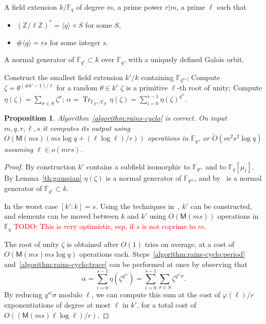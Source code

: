 \documentclass[12pt]{article}
\theoremstyle{plain}
\newtheorem{proposition}[theorem]{Proposition}
\theoremstyle{definition}
\newcommand{\tildO}{\tilde{O}}
\newcommand{\todo}[1]{\textcolor{red}{TODO: #1}}
\DeclareMathOperator{\trace}{Tr} %
\def\Z{\ensuremath{\mathbb{Z}}}
\def\F{\ensuremath{\mathbb{F}}}
\def\MM{\ensuremath{\mathsf{M}}}
\def\euler{\ensuremath{\varphi}}
\newcounter{algorithm}
\begin{document}
\begin{algorithm}
  \label{algorithm:rains-cyclo}
  \begin{algorithmic}[1]
    \REQUIRE A field extension $k/\F_q$ of degree $m$, a prime power
    $r|m$, a prime $\ell$ such that
    \begin{itemize}
    \item $(\Z/\ell\Z)^\ast = \langle q\rangle \times S$ for some $S$,
    \item $\#\langle q\rangle = rs$ for some integer $s$.
    \end{itemize}
    \ENSURE A normal generator of $\F_{q^r}\subset k$ over $\F_q$,
    with a uniquely defined Galois orbit.
    
    \STATE Construct the smallest field extension $k'/k$
    containing $\F_{q^{rs}}$; 
    \REPEAT
    \STATE Compute $\zeta = \theta^{(\#k'-1)/\ell}$ for a random $\theta\in k'$
    \UNTIL $\zeta$ is a primitive $\ell$-th root of unity;
    \STATE\label{algorithm:rains-cyclo:period} Compute $\eta(\zeta) = \sum_{\sigma\in S}\zeta^\sigma$;
    \RETURN\label{algorithm:rains-cyclo:trace} $\alpha = \trace_{\F_{q^{rs}}/\F_{q^r}}\eta(\zeta) = \sum_{i=0}^{s-1}\eta(\zeta)^{q^{ri}}$.
  \end{algorithmic}
\end{algorithm}

\begin{proposition}
  Algorithm~\ref{algorithm:rains-cyclo} is correct. On input
  $m,q,r,\ell,s$ it computes its output using $O(\MM(ms)(ms\log q +
  (\ell\log\ell)/r))$ operations in $\F_q$, or $\tildO(m^2s^2\log q)$
  assuming $\ell\in o(mrs)$.
\end{proposition}
\begin{proof}
  By construction $k'$ contains a subfield isomorphic to $\F_{q^{rs}}$
  and to $\F_q[\mu_\ell]$. By Lemma~\ref{th:gaussian} $\eta(\zeta)$ is
  a normal generator of $\F_{q^{rs}}$, and
  by~\cite[Prop.~5.2.3.1]{mullen2013handbook} is a normal generator of
  $\F_{q^r}\subset k$.

  In the worst case $[k':k]=s$. Using the techniques
  in~\cite{couveignes+lercier11,DeDoSc13,DeFeo:2014:FAA:2608628.2608672},
  $k'$ can be constructed, and elements can be moved between $k$ and
  $k'$ using $O(\MM(ms))$ operations in $\F_q$ \todo{This is very
    optimistic, esp. if $s$ is not coprime to $m$}.

  The root of unity $\zeta$ is obtained after $O(1)$ tries on average,
  at a cost of $O(\MM(ms)ms\log q)$ operations each.
  Steps~\ref{algorithm:rains-cyclo:period}
  and~\ref{algorithm:rains-cyclo:trace} can be performed at once by
  observing that
  \[\alpha = \sum_{i=0}^{s-1}\eta(\zeta^{q^{ri}})= \sum_{i=0}^{s-1}\sum_{\sigma\in S}\zeta^{q^{ri}\sigma}.\]
  By reducing $q^{ri}\sigma$ modulo $\ell$, we can compute this sum at
  the cost of $\euler(\ell)/r$ exponentiations of degree at most
  $\ell$ in $k'$, for a total cost of $O((\MM(ms)\ell\log\ell)/r)$.
\end{proof}
\end{document}
